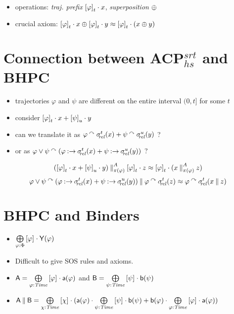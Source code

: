 \begin{slide}
\begin{itemize}
\begin{itemize}
  \item operations: \emph{traj. prefix} $\tpref{\varphi}{t}\seqc x$, \emph{superposition} $\superps$
  \item crucial axiom: $\tpref{\varphi}{t}\seqc x\superps \tpref{\varphi}{t}\seqc y\id \tpref{\varphi}{t}\seqc (x\superps y)$
  \end{itemize}
\end{itemize}
\newslide\section*{Connection between ACP$^{srt}_{hs}$ and BHPC}
\begin{itemize}
\item trajectories $\varphi$ and $\psi$ are different on the entire interval $(0,t]$ for some $t$
\item consider $\tpref{\varphi}{t}\seqc x+\tpref{\psi}{u}\seqc y$
\item can we translate it as $\varphi\csins\delay{t}(x)+\psi\csins\delay{u}(y)$ ?
\pause
\item or as $\varphi\vee\psi\csins(\varphi\cond\delay{t}(x)+\psi\cond\delay{u}(y))$ ?
\end{itemize}

\[(\tpref{\varphi}{t}\seqc x+\tpref{\psi}{u}\seqc y)\parc^A_{\pi(\varphi)}\tpref{\varphi}{t}\seqc z\id \tpref{\varphi}{t}\seqc (x\parc^A_{\pi(\varphi)} z)\]
\[\varphi\vee\psi\csins(\varphi\cond\delay{t}(x)+\psi\cond\delay{u}(y))\parc\varphi\csins\delay{t}(z)\id \varphi\csins\delay{t}(x\parc z)\]
\newslide\section*{BHPC and Binders}
\begin{itemize}
\item $\superpos{\varphi\ap\Phi}\tpref{\varphi}{}\seqc \pr{Y}(\varphi)$
\item Difficult to give SOS rules and axioms.
\item $\pr{A}=\superpos{\varphi\ap\Time}\tpref{\varphi}{}\seqc\act{a}(\varphi)$
and $\pr{B}=\superpos{\psi\ap\Time}\tpref{\psi}{}\seqc\act{b}(\psi)$
\item $\pr{A}\parc\pr{B}=\superpos{\chi\ap\Time}\tpref{\chi}{}\seqc(\act{a}(\varphi)\seqc\superpos{\psi\ap\Time}\tpref{\psi}{}\seqc\act{b}(\psi)+\act{b}(\varphi)\seqc\superpos{\varphi\ap\Time}\tpref{\varphi}{}\seqc\act{a}(\varphi))$
\end{itemize}


\end{slide}
